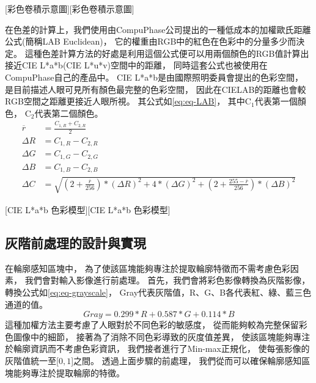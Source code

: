 \documentclass[class=NCU_thesis, crop=false]{standalone}
\begin{document}
			[彩色卷積示意圖]

			在色差的計算上，我們使用由CompuPhase公司提出的一種低成本的加權歐氏距離公式\cite{LABformula}(簡稱LAB Euclidean)，
		  	它的權重由RGB中的紅色在色彩中的分量多少而決定。
		  	這種色差計算方法的好處是利用這個公式便可以用兩個顏色的RGB值計算出接近CIE L*a*b(CIE L*u*v)空間中的距離，
		  	同時這套公式也被使用在CompuPhase自己的產品中。
		  	CIE L*a*b是由國際照明委員會提出的色彩空間，
		  	是目前描述人眼可見所有顏色最完整的色彩空間，
		  	因此在CIELAB的距離也會較RGB空間之距離更接近人眼所視。
		  	其公式如\cref{eq:eq-LAB}，
		  	其中C$_{1}$代表第一個顏色，
		  	C$_{2}$代表第二個顏色。
		  	\begin{equation}
		    \label{eq:eq-LAB}
		    \begin{split}
		    	\overline{r} & = \frac{C_{1,R} + C_{2,R}}{2} \\
		    	\Delta R & = C_{1,R} - C_{2,R} \\
		    	\Delta G & = C_{1,G} - C_{2,G} \\
		    	\Delta B & = C_{1,B} - C_{2,B} \\
		    	\Delta C & = \sqrt{(2 + \frac{\overline{r}}{256}) * (\Delta R)^2 + 4 * (\Delta G)^2 + (2 + \frac{255 - \overline{r}}{256}) * (\Delta B)^2}
		    \end{split}
			\end{equation}

			[CIE L*a*b 色彩模型][CIE L*a*b 色彩模型]

	\subsection{灰階前處理的設計與實現}
		在輪廓感知區塊中，
		為了使該區塊能夠專注於提取輪廓特徵而不需考慮色彩因素，
		我們會對輸入影像進行前處理。
		首先，我們會將彩色影像轉換為灰階影像，
		轉換公式如\cref{eq:eq-grayscale}，
		Gray代表灰階值，R、G、B各代表紅、綠、藍三色通道的值。
		\begin{equation}
		    \label{eq:eq-grayscale}
		    Gray = 0.299 * R + 0.587 * G + 0.114 * B
		\end{equation}
		這種加權方法主要考慮了人眼對於不同色彩的敏感度，
		從而能夠較為完整保留彩色圖像中的細節，
		接著為了消除不同色彩導致的灰度值差異，
		使該區塊能夠專注於輪廓資訊而不考慮色彩資訊，
		我們接者進行了Min-max正規化，
		使每張影像的灰階值統一至[$0, 1$]之間。
		透過上面步驟的前處理，
		我們從而可以確保輪廓感知區塊能夠專注於提取輪廓的特徵。
\end{document}
